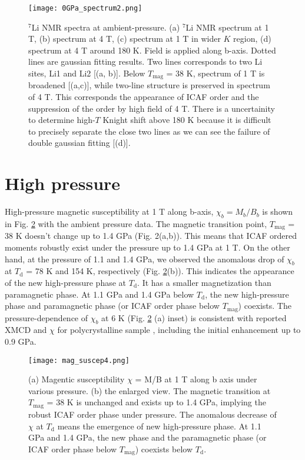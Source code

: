 \documentclass[a4,10.5pt]{report}
\begin{document}
\begin{figure}
  \centering
  \texttt{[image: 0GPa\_spectrum2.png]}
  \caption{${}^7$Li NMR spectra at ambient-pressure.
  (a) ${}^7$Li NMR spectrum at 1 T, (b) spectrum at 4 T, (c) spectrum at 1 T in wider $K$ region, (d) spectrum at 4 T around 180 K.
   Field is applied along b-axis.
   Dotted lines are gaussian fitting results.
  Two lines corresponds to two Li sites, Li1 and Li2 [(a, b)]. 
  Below $T_{\mathrm{mag}}$ = 38 K, spectrum of 1 T is broadened [(a,c)], while two-line structure is preserved in spectrum of 4 T.
  This corresponds the appearance of ICAF order and the suppression of the order by high field of 4 T.
  There is a uncertainity to determine high-$T$ Knight shift above 180 K because it is difficult to precisely separate the close two lines as we can see the failure of double
  gaussian fitting [(d)].}
  \label{0GPa_spectrum}
\end{figure}

\newpage
\section{High pressure}
High-pressure magnetic susceptibility at 1 T along b-axis, $\chi_b=M_b/B_b$ is shown in Fig. \ref{mag_suscep} with the ambient pressure data. 
The magnetic transition point, $T_{\mathrm{mag}}$ = 38 K doesn't change up to 1.4 GPa (Fig. 2(a,b)). 
This means that ICAF ordered moments robustly exist under the pressure up to 1.4 GPa at 1 T. 
On the other hand, at the pressure of 1.1 and 1.4 GPa, we observed the anomalous drop of $\chi_b$ at $T_{\mathrm{d}}$ = 78 K and 154 K, respectively (Fig. \ref{mag_suscep}(b)). 
This indicates the appearance of the new high-pressure phase at $T_{\mathrm{d}}$. 
It has a smaller magnetization than paramagnetic phase. 
At 1.1 GPa and 1.4 GPa below $T_{\mathrm{d}}$, the new high-pressure phase and paramagnetic phase (or ICAF order phase below $T_{\mathrm{mag}}$) coexists. 
The pressure-dependence of $\chi_b$ at 6 K (Fig. \ref{mag_suscep} (a) inset) is consistent with reported XMCD \cite{takayama2015hyperhoneycomb} 
and $\chi$ for polycrystalline sample \cite{Majumder2018}, 
including the initial enhancement up to 0.9 GPa.

\begin{figure}
  \centering
  \texttt{[image: mag\_suscep4.png]}
  \caption{(a) Magentic susceptibility $\chi$ = M/B at 1 T along b axis under various pressure. 
  (b) the enlarged view. The magnetic transition at $T_{\mathrm{mag}}$ = 38 K is unchanged and exists up to 1.4 GPa, implying the robust ICAF order phase under pressure. 
  The anomalous decrease of $\chi$ at $T_{\mathrm{d}}$ means the emergence of new high-pressure phase. 
  At 1.1 GPa and 1.4 GPa, the new phase and the paramagnetic phase (or ICAF order phase below $T_{\mathrm{mag}}$) coexists below $T_{\mathrm{d}}$.}
  \label{mag_suscep}
\end{figure}
\end{document}
